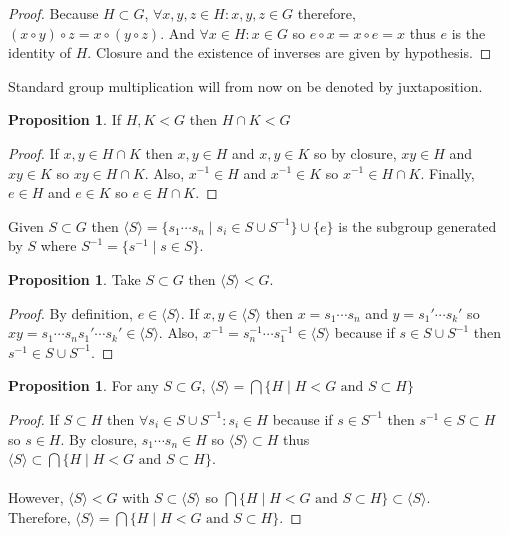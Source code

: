 \documentclass[12pt]{extarticle}
\renewcommand\qedsymbol{$\square$}
\theoremstyle{definition}
\newtheorem{proposition}[theorem]{Proposition}
\newenvironment{definition}[1][Definition:]{\begin{trivlist}
\item[\hskip \labelsep {\bfseries #1}]}{\end{trivlist}}
\newenvironment{lproof}{\begin{proof} \renewcommand{\qedsymbol}{}}{\end{proof}}
\newcommand{\gen}[1]{\langle #1 \rangle}
\begin{document}
\begin{proof}
Because $H \subset G$, $\forall x,y,z \in H : x,y,z \in G$ therefore, $(x\circ y)\circ z = x \circ (y \circ z)$. And $\forall x \in H : x \in G$ so $e \circ x = x \circ e = x$ thus $e$ is the identity of $H$. Closure and the existence of inverses are given by hypothesis. 
\end{proof}

Standard group multiplication will from now on be denoted by juxtaposition. 

\begin{proposition}
If $H, K < G$ then $H \cap K < G$
\end{proposition}

\begin{lproof}
If $x,y \in H \cap K$ then $x, y \in H$ and $x, y \in K$ so by closure, $xy \in H$ and $xy \in K$ so $xy \in H \cap K$. Also, $x^{-1} \in H$ and $x^{-1} \in K$ so $x^{-1} \in H \cap K$. Finally, $e \in H$ and $e \in K$ so $e \in H \cap K$.
\end{lproof}

\begin{definition}
Given $S \subset G$ then $\gen{S} = \{s_1 \cdots s_n \mid s_i \in S \cup S^{-1} \} \cup \{e\}$ is the subgroup generated by $S$ where $S^{-1} = \{s^{-1} \mid s \in S\}$.
\end{definition}

\begin{proposition}
Take $S \subset G$ then $\gen{S} < G$.
\end{proposition}

\begin{lproof}
By definition, $e \in \gen{S}$. If $x, y \in \gen{S}$ then $x = s_1 \cdots s_n$ and $y = s_1' \cdots s_k'$ so $xy = s_1 \cdots s_n s_1' \cdots s_k' \in \gen{S}$. Also, $x^{-1} = s_n^{-1} \cdots s_1^{-1} \in \gen{S}$ because if $s \in S \cup S^{-1}$ then $s^{-1} \in S \cup S^{-1}$.
\end{lproof}

\begin{proposition}
For any $S \subset G$, $\gen{S}  = \bigcap \{H \mid H < G \text{ and } S \subset H\}$
\end{proposition}

\begin{lproof}
If $S \subset H$ then $\forall s_i \in S \cup S^{-1} : s_i \in H$ because if $s \in S^{-1}$ then $s^{-1} \in S \subset H$ so $s \in H$. By closure, $s_1 \cdots s_n \in H$ so $\gen{S} \subset H$ thus $\gen{S} \subset \bigcap \{H \mid H < G \text{ and } S \subset H\}$. \\ \\ However, $\gen{S} < G$ with $S \subset \gen{S}$ so $\bigcap \{H \mid H < G \text{ and } S \subset H\} \subset \gen{S}$. \\ Therefore, $\gen{S}  = \bigcap \{H \mid H < G \text{ and } S \subset H\}$.
\end{lproof}
\end{document}
